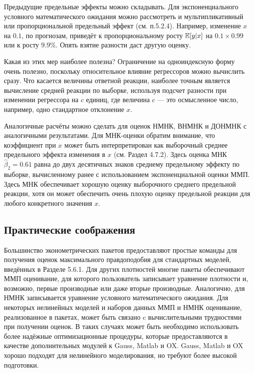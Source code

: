 Предыдущие предельные эффекты можно складывать. Для экспоненциального условного математического ожидания можно рассмотреть и мультипликативный или пропорциональной предельный эффект (см. п.5.2.4). Например, изменение $x$ на $0.1$, по прогнозам, приведёт к пропорциональному росту $\mathbb{E}[y|x]$ на $0.1 \times 0.99$ или к росту $9.9\%$. Опять взятие разности даст другую оценку.

Какая из этих мер наиболее полезна? Ограничение на одноиндексную форму очень полезно, поскольку относительное влияние регрессоров можно вычислить сразу. Что касается величины ответной реакции, наиболее точным является вычисление средней реакции по выборке, используя подсчет разности при изменении регрессора на $c$ единиц, где величина $c$ --- это осмысленное число, например,  одно стандартное отклонение $x$.

Аналогичные расчёты можно сделать для  оценок НМНК, ВНМНК и ДОНМНК с аналогичными результатами. Для МНК-оценки обратим внимание, что коэффициент при $x$ может быть интерпретирован как выборочный среднее предельного эффекта изменения в $x$ (см. Раздел 4.7.2). Здесь оценка МНК $\hat{\beta}_2=0.61$ равна до двух десятичных знаков среднему предельному эффекту по выборке, вычисленному ранее с использованием экспоненциальной оценки ММП. Здесь МНК обеспечивает хорошую оценку выборочного среднего предельной реакции, хотя он может обеспечить очень плохую оценку предельной реакции для любого конкретного значения $x$.

\subsection{Практические соображения}

Большинство эконометрических пакетов предоставляют простые команды для получения оценок максимального правдоподобия для стандартных моделей, введённых в Разделе 5.6.1. Для других плотностей многие пакеты обеспечивают ММП оценивание, для которого пользователь записывает уравнение плотности и, возможно, первые производные или даже вторые производные. Аналогично, для НМНК записывается уравнение условного математического ожидания. Для некоторых нелинейных моделей и наборов данных ММП и НМНК оценивание, реализованное в пакетах, может  быть связано c вычислительными трудностями при получении оценок. В таких случаях может быть необходимо использовать более надёжные оптимизационные процедуры, которые предоставляются в качестве дополнительных модулей к Gauss, Matlab и OX. Gauss, Matlab и OX хорошо подходят для нелинейного моделирования, но требуют более высокой подготовки.

